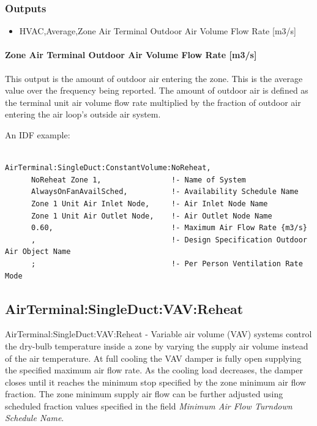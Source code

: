 \subsubsection{Outputs}

\begin{itemize}
\item
  HVAC,Average,Zone Air Terminal Outdoor Air Volume Flow Rate {[}m3/s{]}
\end{itemize}

\paragraph{Zone Air Terminal Outdoor Air Volume Flow Rate {[}m3/s{]}}

This output is the amount of outdoor air entering the zone. This is the average value over the frequency being reported. The amount of outdoor air is defined as the terminal unit air volume flow rate multiplied by the fraction of outdoor air entering the air loop's outside air system.

An IDF example:

\begin{lstlisting}

AirTerminal:SingleDuct:ConstantVolume:NoReheat,
      NoReheat Zone 1,                !- Name of System
      AlwaysOnFanAvailSched,          !- Availability Schedule Name
      Zone 1 Unit Air Inlet Node,     !- Air Inlet Node Name
      Zone 1 Unit Air Outlet Node,    !- Air Outlet Node Name
      0.60,                           !- Maximum Air Flow Rate {m3/s}
      ,                               !- Design Specification Outdoor Air Object Name
      ;                               !- Per Person Ventilation Rate Mode
\end{lstlisting}

\subsection{AirTerminal:SingleDuct:VAV:Reheat}\label{airterminalsingleductvavreheat}

AirTerminal:SingleDuct:VAV:Reheat - Variable air volume (VAV) systems control the dry-bulb temperature inside a zone by varying the supply air volume instead of the air temperature. At full cooling the VAV damper is fully open supplying the specified maximum air flow rate. As the cooling load decreases, the damper closes until it reaches the minimum stop specified by the zone minimum air flow fraction. The zone minimum supply air flow can be further adjusted using scheduled fraction values specified in the field \textit{Minimum Air Flow Turndown Schedule Name}.

